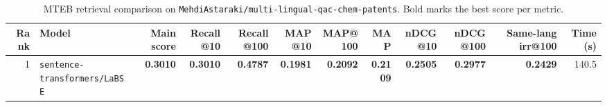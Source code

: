 \begin{table}[t]
\centering
\small
\begin{tabular}{r l r r r r r r r r r r}
\hline
Rank & Model & Main score & Recall@10 & Recall@100 & MAP@10 & MAP@100 & MAP & nDCG@10 & nDCG@100 & Same-lang irr@100 & Time (s) \\
\hline
1 & \texttt{sentence-transformers/LaBSE} & \textbf{0.3010} & \textbf{0.3010} & \textbf{0.4787} & \textbf{0.1981} & \textbf{0.2092} & \textbf{0.2109} & \textbf{0.2505} & \textbf{0.2977} & \textbf{0.2429} & 140.5 \\
\hline
\end{tabular}
\caption{MTEB retrieval comparison on \texttt{MehdiAstaraki/multi-lingual-qac-chem-patents}. Bold marks the best score per metric.}
\label{tab:mteb-model-comparison}
\end{table}
